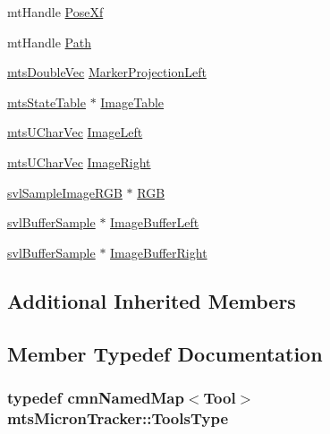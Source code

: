 \begin{DoxyCompactItemize}
\item 
mt\+Handle \hyperlink{classmts_micron_tracker_aaa5b0c0dc913a0ba93d24e52d2af392c}{Pose\+Xf}
\item 
mt\+Handle \hyperlink{classmts_micron_tracker_a671813b6e8c02f16f6bd5b45e2c0a7f4}{Path}
\item 
\hyperlink{mts_vector_8h_af69167a5dc2ad33eb93965b9387d8403}{mts\+Double\+Vec} \hyperlink{classmts_micron_tracker_a1ff396c1b97679eeffa92914bca1ac4c}{Marker\+Projection\+Left}
\item 
\hyperlink{classmts_state_table}{mts\+State\+Table} $\ast$ \hyperlink{classmts_micron_tracker_af70cb9ac4628c9f3d8d8a902baf5f831}{Image\+Table}
\item 
\hyperlink{mts_vector_8h_af820219f2f2497ada1dfccfa2747982a}{mts\+U\+Char\+Vec} \hyperlink{classmts_micron_tracker_aac820722ad86e7563f8eea1499a61ab3}{Image\+Left}
\item 
\hyperlink{mts_vector_8h_af820219f2f2497ada1dfccfa2747982a}{mts\+U\+Char\+Vec} \hyperlink{classmts_micron_tracker_a07b7942fd2fd04d1849cd39189c7e93a}{Image\+Right}
\item 
\hyperlink{svl_sample_image_types_8h_a54a55112dd3879f71f990d2945375f1a}{svl\+Sample\+Image\+R\+G\+B} $\ast$ \hyperlink{classmts_micron_tracker_a891e38ee9165abc0cc182c769eff7de6}{R\+G\+B}
\item 
\hyperlink{classsvl_buffer_sample}{svl\+Buffer\+Sample} $\ast$ \hyperlink{classmts_micron_tracker_a98e0dbd21c7d9a238e213888920469f0}{Image\+Buffer\+Left}
\item 
\hyperlink{classsvl_buffer_sample}{svl\+Buffer\+Sample} $\ast$ \hyperlink{classmts_micron_tracker_a9a318503d10e493581cda519e024fd09}{Image\+Buffer\+Right}
\end{DoxyCompactItemize}
\subsection*{Additional Inherited Members}


\subsection{Member Typedef Documentation}
\hypertarget{classmts_micron_tracker_a240bfec6cae665e2f2f53ec31bbcff12}{}
\subsubsection[{Tools\+Type}]{\setlength{\rightskip}{0pt plus 5cm}typedef {\bf cmn\+Named\+Map}$<${\bf Tool}$>$ {\bf mts\+Micron\+Tracker\+::\+Tools\+Type}\hspace{0.3cm}{\ttfamily [protected]}}\label{classmts_micron_tracker_a240bfec6cae665e2f2f53ec31bbcff12}


